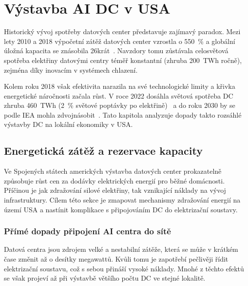 \chapter{Výstavba AI DC v USA}
\label{chap:dopady_usa}

Historický vývoj spotřeby datových center představuje zajímavý paradox. Mezi lety 2010 a 2018 výpočetní zátěž datových center vzrostla o 550~\% a globální úložná kapacita se znásobila 26krát~\cite[s.~10]{de_roucy-rochegonde_ai_2025}. Navzdory tomu zůstávala celosvětová spotřeba elektřiny datovými centry téměř konstantní (zhruba 200~TWh ročně), zejména díky inovacím v systémech chlazení.~\cite[s.~255]{barroso_data_2026}

Kolem roku 2018 však efektivita narazila na své technologické limity a křivka energetické náročnosti začala růst. V roce 2022 dosáhla světová spotřeba DC zhruba 460~TWh (2~\% světové poptávky po elektřině)~\cite{de_roucy-rochegonde_ai_2025, sheng_power_2026} a do roku 2030 by se podle IEA mohla zdvojnásobit~\cite[s.~14]{international_energy_agency_iea_energy_2025}. Tato kapitola analyzuje dopady takto rozsáhlé výstavby DC na lokální ekonomiky v USA.

\section{Energetická zátěž a rezervace kapacity}
\label{sec:energie_dopady}

Ve Spojených státech amerických výstavba datových center prokazatelně způsobuje růst cen za dodávky elektrických energií pro běžné domácnosti. Příčinou je jak zdražování silové elektřiny, tak vznikající náklady na vývoj infrastruktury. Cílem této sekce je zmapovat mechanismy zdražování energií na území USA a nastínit komplikace s připojováním DC do elektrizační soustavy.

\subsection{Přímé dopady připojení AI centra do sítě}
\label{subsec:energie_dopady_prime}

Datová centra jsou zdrojem velké a nestabilní zátěže, která se může v krátkém čase změnit až o desítky megawattů. Kvůli tomu je zapotřebí pečlivěji řídit elektrizační soustavu, což s sebou přináší vysoké náklady. Mnohé z těchto efektů se však projeví až při výstavbě většího počtu DC ve stejné lokalitě.

